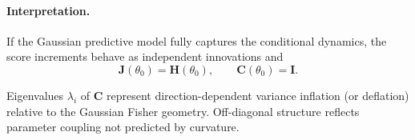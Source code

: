 \documentclass[11pt]{article}
\begin{document}
\paragraph{Interpretation.}
If the Gaussian predictive model fully captures the conditional dynamics,
the score increments behave as independent innovations and
\begin{equation}
\mathbf J(\theta_0) = \mathbf H(\theta_0),
\qquad
\mathbf C(\theta_0) = \mathbf I.
\end{equation}

Eigenvalues $\lambda_i$ of $\mathbf C$ represent direction-dependent variance inflation
(or deflation) relative to the Gaussian Fisher geometry.
Off-diagonal structure reflects parameter coupling not predicted by curvature.
\end{document}
